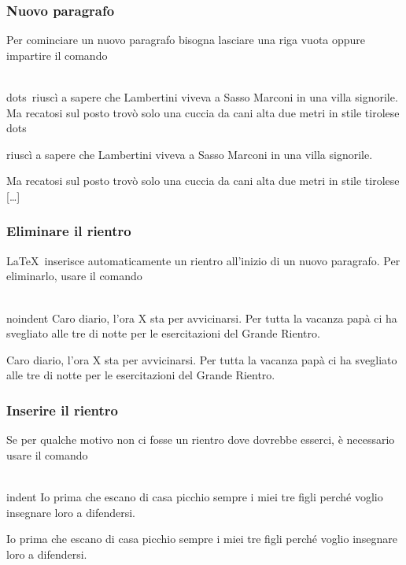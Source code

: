 \documentclass[svgnames,%
	ucs,%
	pdftex]{guitbeamer}
\begin{document}
\begin{frame}
  \frametitle{Nuovo paragrafo}
	Per cominciare un nuovo paragrafo bisogna lasciare una riga vuota
	oppure impartire il comando 
	\begin{LaTeXcode}
		\tls\\dots\trs\ riusc\`i a sapere che Lambertini viveva a
		Sasso Marconi in una villa signorile.\nn
		Ma recatosi sul posto trov\`o solo una cuccia da cani
		alta due metri in stile tirolese \tls\\dots\trs
	\end{LaTeXcode}
	\begin{LaTeXoutput}[]
		[\dots] riusc\`i a sapere che Lambertini viveva a Sasso Marconi in una
		villa signorile.

		Ma recatosi sul posto trov\`o solo una cuccia da cani alta due metri
		in stile tirolese [\dots]
	\end{LaTeXoutput}
\end{frame}
\begin{frame}
  \frametitle{Eliminare il rientro}
	\LaTeX\ inserisce automaticamente un rientro all'inizio di un nuovo
	paragrafo. Per eliminarlo, usare il comando \LCmd{noindent}
	\begin{LaTeXcode}
		\alert{\\noindent} Caro diario, l'ora X sta per
		avvicinarsi. Per tutta la vacanza pap\`a ci ha svegliato
		alle tre di notte per le esercitazioni del Grande
		Rientro.
	\end{LaTeXcode}
	\begin{LaTeXoutput}
		\noindent Caro diario, l'ora X sta per avvicinarsi. Per tutta la
		vacanza pap\`a ci ha svegliato alle tre di notte per le
		esercitazioni del Grande Rientro.
	\end{LaTeXoutput}
\end{frame}
\begin{frame}
  \frametitle{Inserire il rientro}
	Se per qualche motivo non ci fosse un rientro dove dovrebbe esserci,
	\`e necessario usare il comando \LCmd{indent}
	\begin{LaTeXcode}
		\alert{\\indent} Io prima che escano di casa picchio sempre i miei
		tre figli perch\'e voglio insegnare loro a difendersi.
	\end{LaTeXcode}
	\begin{LaTeXoutput}
		Io prima che escano di casa picchio sempre i miei tre figli perch\'e
		voglio insegnare loro a difendersi.
	\end{LaTeXoutput}
\end{frame}
\end{document}
